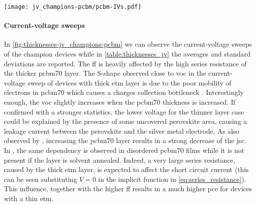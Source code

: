 	\begin{SCfigure}
		\centering
		\texttt{[image: jv\_champions-pcbm/pcbm-IVs.pdf]}
		\label{fig:thicknesses-jv_champions-pcbm}
	\end{SCfigure}

	\paragraph{Current-voltage sweeps}
	In \cref{fig:thicknesses-jv_champions-pcbm} we can observe the current-voltage sweeps of the champion devices while in \cref{table:thicknesses_jv} the averages and standard deviations are reported.
	The \gls{ff} is heavily affected by the high series resistance of the thicker \gls{pcbm70} layer.
	The S-shape observed close to \gls{voc} in the current\hyp{}voltage sweep of devices with thick \gls{etm} layer is due to the poor mobility of electrons in \gls{pcbm70} \cite{VonHauff2005} which causes a charges collection bottleneck \cite{Wheeler2015}.
	Interestingly enough, the \gls{voc} slightly increases when the \gls{pcbm70} thickness is increased.
	If confirmed with a stronger statistics, the lower voltage for the thinner layer case could be explained by the presence of some uncovered perovskite area, causing a leakage current between the perovskite and the silver metal electrode.
	As also observed by , increasing the \gls{pcbm70} layer results in a strong decrease of the \gls{jsc}.
	In , the same dependency is observed in disordered \gls{pcbm70} films while it is not present if the layer is solvent annealed.
	Indeed, a very large series resistance, caused by the thick \gls{etm} layer, is expected to affect the short circuit current (this can be seen substituting $V=0$ in the implicit function in \cref{eq:series_resistance}).
	This influence, together with the higher \gls{ff} results in a much higher \gls{pce} for devices with a thin \gls{etm}.

